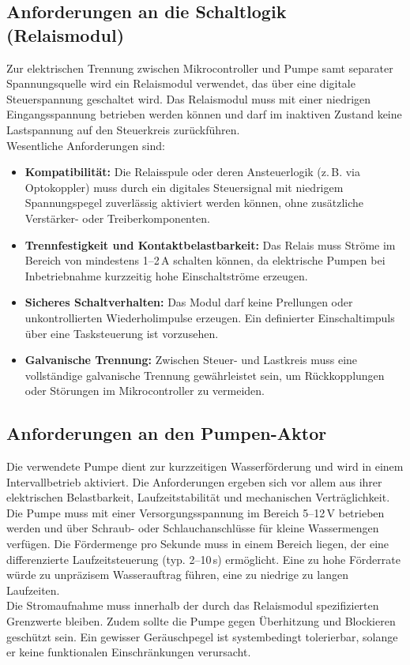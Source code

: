\subsection{Anforderungen an die Schaltlogik (Relaismodul)}

Zur elektrischen Trennung zwischen Mikrocontroller und Pumpe samt separater Spannungsquelle wird ein Relaismodul verwendet, das über eine digitale Steuerspannung geschaltet wird. Das Relaismodul muss mit einer niedrigen Eingangsspannung betrieben werden können und darf im inaktiven Zustand keine Lastspannung auf den Steuerkreis zurückführen.
\\
Wesentliche Anforderungen sind:

\begin{itemize}
	\item \textbf{Kompatibilität:} Die Relaisspule oder deren Ansteuerlogik (z.\,B. via Optokoppler) muss durch ein digitales Steuersignal mit niedrigem Spannungspegel zuverlässig aktiviert werden können, ohne zusätzliche Verstärker- oder Treiberkomponenten.
	
	\item \textbf{Trennfestigkeit und Kontaktbelastbarkeit:} Das Relais muss Ströme im Bereich von mindestens 1–2\,A schalten können, da elektrische Pumpen bei Inbetriebnahme kurzzeitig hohe Einschaltströme erzeugen.
	
	\item \textbf{Sicheres Schaltverhalten:} Das Modul darf keine Prellungen oder unkontrollierten Wiederholimpulse erzeugen. Ein definierter Einschaltimpuls über eine Tasksteuerung ist vorzusehen.
	
	\item \textbf{Galvanische Trennung:} Zwischen Steuer- und Lastkreis muss eine vollständige galvanische Trennung gewährleistet sein, um Rückkopplungen oder Störungen im Mikrocontroller zu vermeiden.
\end{itemize}

\subsection{Anforderungen an den Pumpen-Aktor}

Die verwendete Pumpe dient zur kurzzeitigen Wasserförderung und wird in einem Intervallbetrieb aktiviert. Die Anforderungen ergeben sich vor allem aus ihrer elektrischen Belastbarkeit, Laufzeitstabilität und mechanischen Verträglichkeit.
\\
Die Pumpe muss mit einer Versorgungsspannung im Bereich 5–12\,V betrieben werden und über Schraub- oder Schlauchanschlüsse für kleine Wassermengen verfügen. Die Fördermenge pro Sekunde muss in einem Bereich liegen, der eine differenzierte Laufzeitsteuerung (typ. 2–10\,s) ermöglicht. Eine zu hohe Förderrate würde zu unpräzisem Wasserauftrag führen, eine zu niedrige zu langen Laufzeiten.
\\
Die Stromaufnahme muss innerhalb der durch das Relaismodul spezifizierten Grenzwerte bleiben. Zudem sollte die Pumpe gegen Überhitzung und Blockieren geschützt sein. Ein gewisser Geräuschpegel ist systembedingt tolerierbar, solange er keine funktionalen Einschränkungen verursacht.

